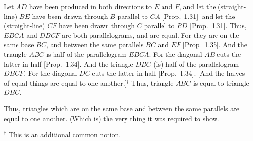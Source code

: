 \begin{Parallel}{}{}
{Let $AD$ have been produced in both directions to $E$ and $F$, and let the
(straight-line) $BE$ have been drawn through $B$ parallel to $CA$ [Prop.~1.31],
and let the (straight-line) $CF$ have been drawn through $C$ parallel to
$BD$ [Prop.~1.31]. Thus, $EBCA$ and $DBCF$ are both parallelograms,
and are equal. For they are on the same base $BC$, and between
the same parallels $BC$ and $EF$ [Prop.~1.35]. And the triangle $ABC$ is
half of 
the parallelogram
$EBCA$. For the diagonal $AB$ cuts the latter in half [Prop.~1.34]. And the 
triangle $DBC$ (is) half of the parallelogram $DBCF$. For the diagonal
$DC$ cuts the latter in half [Prop.~1.34]. [And the halves of equal things are
equal to one another.]$^\dag$
Thus, triangle $ABC$ is equal to triangle $DBC$.

Thus, triangles which are on the same base and between the same parallels
are equal to one another. (Which is) the very thing it was required to show.}
\end{Parallel}
{\footnotesize \noindent$^\dag$ This is an additional common notion.}

